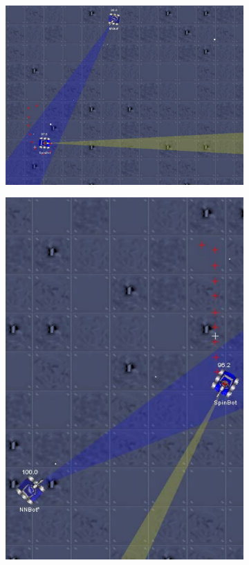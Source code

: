 \documentclass[11pt,a4paper]{article}
\begin{document}
\begin{figure}[h]
	\centering
	\begin{subfigure}
		\centering
		\includegraphics[scale=0.65]{spinbot_good.pdf}
	\end{subfigure}
	\begin{subfigure}
		\centering
		\includegraphics[scale=0.65]{spinbot_bad.pdf}

\end{subfigure}
\end{figure}
\end{document}
